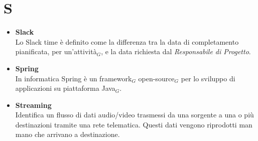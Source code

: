 \chapter{S} \label{S}
\begin{itemize}
	\item \textbf{Slack} \\
	Lo Slack time è definito come la differenza tra la data di completamento pianificata, per un'attività$_G$, e la data richiesta dal \textit{Responsabile di Progetto}.
	
	\item \textbf{Spring}\\
	In informatica Spring è un framework$_G$ open-source$_G$ per lo sviluppo di applicazioni su piattaforma Java$_G$.
	
	\item \textbf{Streaming}\\
	Identifica un flusso di dati audio/video trasmessi da una sorgente a una o più destinazioni tramite una rete telematica. Questi dati vengono riprodotti man mano che arrivano a destinazione.
	
\end{itemize}
	